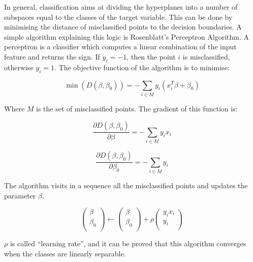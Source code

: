 In general, classification aims at dividing the hyperplanes into a number of subspaces equal to the classes of the target variable. This can be done by minimising the distance of misclassified points to the decision boundaries. A simple algorithm explaining this logic is Rosenblatt’s Perceptron Algorithm. A perceptron is a classifier which computes a linear combination of the input feature and returns the sign. If $y_i=-1$, then the point $i$ is misclassified, otherwise $y_i=1$. The objective function of the algorithm is to minimise:

\begin{equation}
        \min{(D\left(\beta,\beta_0\right))}=-\sum_{i\in M}{y_i(x_i^T\beta+\beta_0)}
        \label{eq_perceptron1}
\end{equation}

Where $M$ is the set of misclassified points. The gradient of this function is:

\begin{equation}
        \frac{\partial D\left(\beta,\beta_0\right)}{\partial\beta}=-\sum_{i\in M}{y_ix_i}
        \label{eq_perceptron2}
\end{equation}

\begin{equation}
        \frac{\partial D\left(\beta,\beta_0\right)}{\partial\beta_0}=-\sum_{i\in M} y_i
        \label{eq_perceptron3}
\end{equation}

The algorithm visits in a sequence all the misclassified points and updates the parameter $\beta$.

\begin{equation}
        \left(\begin{matrix}\beta\\\beta_0\\\end{matrix}\right)\gets\left(\begin{matrix}\beta\\\beta_0\\\end{matrix}\right)+\rho\left(\begin{matrix}y_ix_i\\y_i\\\end{matrix}\right)
        \label{eq_perceptron4}
\end{equation}

$\rho$ is called “learning rate”, and it can be proved that this algorithm converges when the classes are linearly separable.

